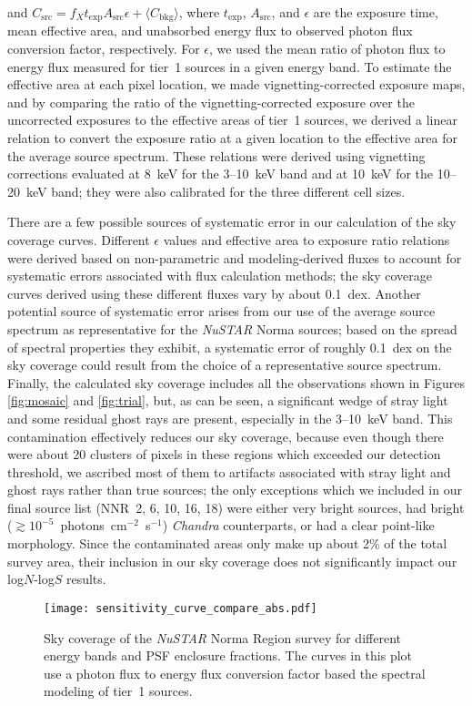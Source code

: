 \documentclass[iop,revtex4]{emulateapj}
\begin{document}
and $C_{\mathrm{src}} = f_X t_{\mathrm{exp}} A_{\mathrm{src}} \epsilon + \langle C_{\mathrm{bkg}}\rangle$, where $t_{\mathrm{exp}}$, $A_{\mathrm{src}}$, and $\epsilon$ are the exposure time, mean effective area, and unabsorbed energy flux to observed photon flux conversion factor, respectively.  For $\epsilon$, we used the mean ratio of photon flux to energy flux measured for tier~1 sources in a given energy band.  To estimate the effective area at each pixel location, we made vignetting-corrected exposure maps, and by comparing the ratio of the vignetting-corrected exposure over the uncorrected exposures to the effective areas of tier~1 sources, we derived a linear relation to convert the exposure ratio at a given location to the effective area for the average source spectrum. These relations were derived using vignetting corrections evaluated at 8~keV for the 3--10~keV band and at 10~keV for the 10--20~keV band; they were also calibrated for the three different cell sizes.  \par
There are a few possible sources of systematic error in our calculation of the sky coverage curves.  Different $\epsilon$ values and effective area to exposure ratio relations were derived based on non-parametric and modeling-derived fluxes to account for systematic errors associated with flux calculation methods; the sky coverage curves derived using these different fluxes vary by about 0.1~dex.  Another potential source of systematic error arises from our use of the average source spectrum as representative for the \textit{NuSTAR} Norma sources; based on the spread of spectral properties they exhibit, a systematic error of roughly 0.1~dex on the sky coverage could result from the choice of a representative source spectrum.  Finally, the calculated sky coverage includes all the observations shown in Figures \ref{fig:mosaic} and \ref{fig:trial}, but, as can be seen, a significant wedge of stray light and some residual ghost rays are present, especially in the 3--10~keV band.  This contamination effectively reduces our sky coverage, because even though there were about 20 clusters of pixels in these regions which exceeded our detection threshold, we ascribed most of them to artifacts associated with stray light and ghost rays rather than true sources; the only exceptions which we included in our final source list (NNR~2, 6, 10, 16, 18) were either very bright sources, had bright ($\gtrsim10^{-5}$~photons~cm$^{-2}$~s$^{-1}$) \textit{Chandra} counterparts, or had a clear point-like morphology.  Since the contaminated areas only make up about 2\% of the total survey area, their inclusion in our sky coverage does not significantly impact our log$N$-log$S$ results.  \par
\begin{figure}[t]
\texttt{[image: sensitivity\_curve\_compare\_abs.pdf]}
\caption{Sky coverage of the \textit{NuSTAR} Norma Region survey for different energy bands and PSF enclosure fractions.  The curves in this plot use a photon flux to energy flux conversion factor based the spectral modeling of tier~1 sources.}
\label{fig:sensitivitycurve}
\end{figure}
\end{document}

